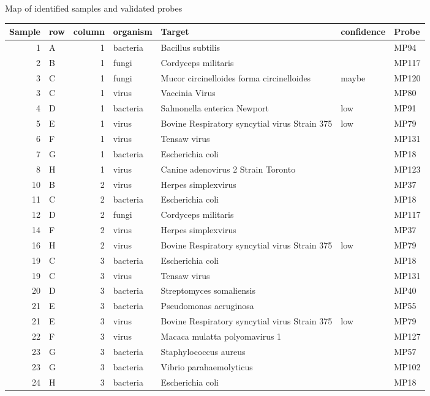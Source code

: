 \documentclass{article}
\begin{document}
Map of identified samples and validated probes

\begin{table}
\centering
\begin{tabular}{rlrllll}
Sample & row & column & organism & Target & confidence & Probe\\
\hline
1 & A & 1 & bacteria & Bacillus subtilis &  & MP94\\
2 & B & 1 & fungi & Cordyceps militaris &  & MP117\\
3 & C & 1 & fungi & Mucor circinelloides forma circinelloides & maybe & MP120\\
3 & C & 1 & virus & Vaccinia Virus &  & MP80\\
4 & D & 1 & bacteria & Salmonella enterica Newport & low & MP91\\
5 & E & 1 & virus & Bovine Respiratory syncytial virus Strain 375 & low & MP79\\
6 & F & 1 & virus & Tensaw virus &  & MP131\\
7 & G & 1 & bacteria & Escherichia coli &  & MP18\\
8 & H & 1 & virus & Canine adenovirus 2 Strain Toronto &  & MP123\\
10 & B & 2 & virus & Herpes simplexvirus &  & MP37\\
11 & C & 2 & bacteria & Escherichia coli &  & MP18\\
12 & D & 2 & fungi & Cordyceps militaris &  & MP117\\
14 & F & 2 & virus & Herpes simplexvirus &  & MP37\\
16 & H & 2 & virus & Bovine Respiratory syncytial virus Strain 375 & low & MP79\\
19 & C & 3 & bacteria & Escherichia coli &  & MP18\\
19 & C & 3 & virus & Tensaw virus &  & MP131\\
20 & D & 3 & bacteria & Streptomyces somaliensis &  & MP40\\
21 & E & 3 & bacteria & Pseudomonas aeruginosa &  & MP55\\
21 & E & 3 & virus & Bovine Respiratory syncytial virus Strain 375 & low & MP79\\
22 & F & 3 & virus & Macaca mulatta polyomavirus 1 &  & MP127\\
23 & G & 3 & bacteria & Staphylococcus aureus &  & MP57\\
23 & G & 3 & bacteria & Vibrio parahaemolyticus &  & MP102\\
24 & H & 3 & bacteria & Escherichia coli &  & MP18\\

\end{tabular}
\end{table}
\end{document}
